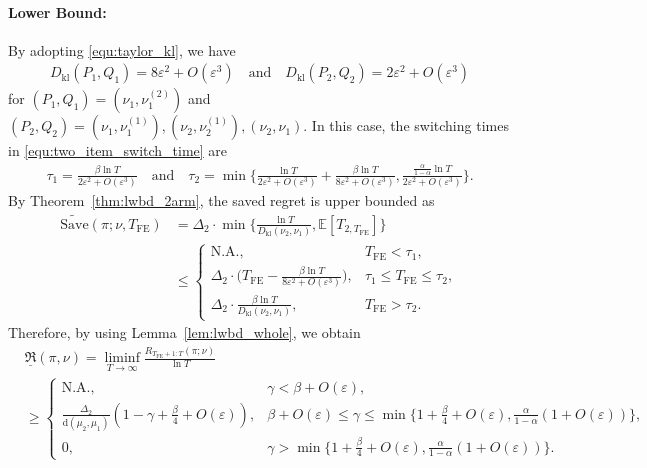 \documentclass[twoside,11pt]{article}
\newcommand{\kl}{D_{\mathrm{kl}}}
\newcommand{\rmd}{\mathrm{d}}
\newcommand{\bbE}{\mathbb{E}}
\newcommand{\Tfe}{T_{\mathrm{FE}}}
\newcommand{\Saved}{\mathrm{Save}}
\begin{document}
\paragraph{Lower Bound:}
By adopting \eqref{equ:taylor_kl}, we have 
\begin{align}
    \kl(P_1,Q_1) = 8\varepsilon^2+O(\varepsilon^3)
    \quad\mbox{and}\quad
    \kl(P_2,Q_2) = 2\varepsilon^2+O(\varepsilon^3)
\end{align}
for $(P_1,Q_1)=(\nu_1,\nu_1^{(2)})$  and $(P_2,Q_2)=(\nu_1,\nu_1^{(1)}),(\nu_2,\nu_2^{(1)}),(\nu_2,\nu_1).$
In this case, the switching times in \eqref{equ:two_item_switch_time} are
\begin{align}
    \tau_1 = \frac{\beta\ln T}{2\varepsilon^2+O(\varepsilon^3)}
    \quad\mbox{and}\quad
    \tau_2 = \min\bigg\{\frac{\ln T}{2\varepsilon^2+O(\varepsilon^3)}+\frac{\beta\ln T}{8\varepsilon^2+O(\varepsilon^3)}, \frac{\frac{\alpha}{1-\alpha}\ln T}{2\varepsilon^2+O(\varepsilon^3)}\bigg\}.
\end{align}
By Theorem~\ref{thm:lwbd_2arm}, the saved regret is upper bounded as
\begin{align}
    \widetilde{\Saved}(\pi;\nu,\Tfe)&=\Delta_2\cdot\min\bigg\{\frac{\ln T}{\kl(\nu_2,\nu_1)},\bbE[T_{2,\Tfe}]\bigg\}
    \\
    &
    \leq
    \begin{cases}
        \mbox{N.A.},& \Tfe < \tau_1,
        \\
        \Delta_2\cdot \Big(\Tfe-\frac{\beta\ln T}{8\varepsilon^2+O(\varepsilon^3)}\Big),& \tau_1\leq \Tfe\leq \tau_2,
        \\
        \Delta_2\cdot \frac{\beta\ln T}{\kl(\nu_2,\nu_1)},& \Tfe> \tau_2.
    \end{cases}
\end{align}
Therefore, by using Lemma~\ref{lem:lwbd_whole}, we obtain
\begin{align}\label{equ:tight_low}
    &\underline{\mathfrak{R}}(\pi,\nu)
    =
    \liminf_{T\to\infty} \frac{R_{\Tfe+1:T} (\pi;\nu ) }{\ln T}
    \\
    &\geq
    \begin{cases}
        \mbox{N.A.},& \gamma<\beta + O(\varepsilon),
        \\
        \frac{\Delta_2}{\rmd(\mu_2,\mu_1)}(1-\gamma+\frac{\beta}{4}+O(\varepsilon)),&
        \beta + O(\varepsilon)\leq \gamma\leq \min\big\{1+\frac{\beta}{4}+O(\varepsilon),\frac{\alpha}{1-\alpha}(1+O(\varepsilon))\big\},
        \\
        0,& \gamma> \min\big\{1+\frac{\beta}{4}+O(\varepsilon),\frac{\alpha}{1-\alpha}(1+O(\varepsilon))\big\}.
    \end{cases}
 \end{align}
\end{document}
